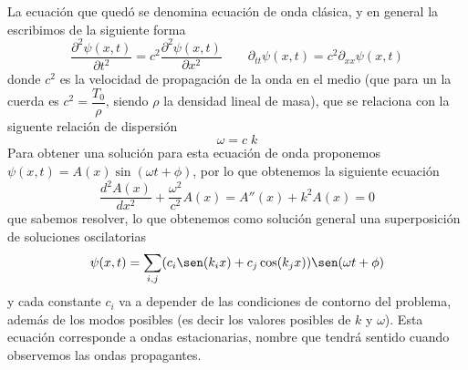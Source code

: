 \documentclass[a4paper]{article}
\numberwithin{equation}{section}
\begin{document}
			La ecuación que quedó se denomina ecuación de onda clásica, y en general la escribimos de la siguiente forma
			\begin{equation}
				\frac{\partial^2 \psi(x,t)}{\partial t^2} = c^2 \frac{\partial^2 \psi(x,t)}{\partial x^2} \qquad \partial_{tt} \psi(x,t) = c^2 \partial_{xx} \psi(x,t)
				\label{eq:ondas_ecuacion}
			\end{equation}
			donde $c^2$ es la velocidad de propagación de la onda en el medio (que para un la cuerda es $c^2 = \dfrac{T_0}{\rho}$, siendo $\rho$ la densidad lineal de masa), que se relaciona con la siguente relación de dispersión
			\begin{equation}
				\omega = c\;k
				\label{eq:onda_dispersion}
			\end{equation}
			Para obtener una solución para esta ecuación de onda proponemos $\psi(x,t) = A(x) \sin(\omega t + \phi)$, por lo que obtenemos la siguiente ecuación
			\begin{equation*}
				\frac{d^2 A(x)}{d x^2} + \frac{\omega^2}{c^2} A(x) = A''(x) + k^2 A(x) = 0
			\end{equation*}
			que sabemos resolver, lo que obtenemos como solución general una superposición de soluciones oscilatorias
			\begin{equation}
				\psi(x,t) = \sum_{i,j} (c_i \sen(k_i x) + c_j \cos(k_j x)) \sen(\omega t + \phi)
				\label{eq:onda_solucion}
			\end{equation}
			y cada constante $c_i$ va a depender de las condiciones de contorno del problema, además de los modos posibles (es decir los valores posibles de $k$ y $\omega$). Esta ecuación corresponde a ondas estacionarias, nombre que tendrá sentido cuando observemos las ondas propagantes.
			
\end{document}
